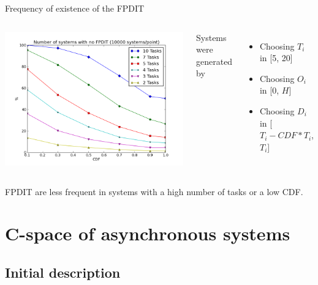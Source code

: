\documentclass{beamer}
\begin{document}
    \begin{frame}{Frequency of existence of the FPDIT}

    \begin{columns}[c]

        \includegraphics[width=1\textwidth]{figs/nofpdit_5.png}

        Systems were generated by
        \begin{itemize}
            \item Choosing $T_i$ in [5, 20]
            \item Choosing $O_i$ in [0, $H$]
            \item Choosing $D_i$ in [$T_i - CDF * T_i$, $T_i$]
        \end{itemize}

    \end{columns}

    FPDIT are less frequent in systems with a high number of tasks or a low CDF.

    \end{frame}

\section{C-space of asynchronous systems}

    \begin{frame}
    \end{frame}

    \subsection{Initial description}
\end{document}
